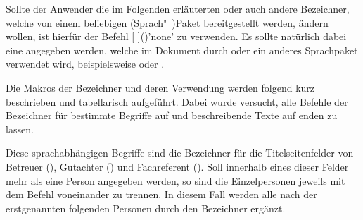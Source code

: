 \begin{Declaration*}{}
\begin{Declaration*}{}
\begin{Declaration*}{}
Sollte der Anwender die im Folgenden erläuterten oder auch andere Bezeichner, 
welche von einem beliebigen (Sprach"~)Paket bereitgestellt werden, ändern 
wollen, ist hierfür der Befehl
[%
]()'none'
zu verwenden. Es sollte natürlich dabei eine  angegeben werden, 
welche im Dokument durch  oder ein anderes Sprachpaket verwendet 
wird, beispielsweise  oder . 

Die Makros der Bezeichner und deren Verwendung werden folgend kurz beschrieben 
und tabellarisch aufgeführt. Dabei wurde versucht, alle Befehle der Bezeichner 
für bestimmte Begriffe auf  und beschreibende 
Texte auf  enden zu lassen.

\begin{Declaration}{}
\begin{Declaration}{}
\begin{Declaration}{}
\begin{Declaration}{}
\begin{Declaration}{}
\begin{Declaration}{}
\begin{Declaration}{}
\begin{Declaration}[v2.02]{}
\printdeclarationlist%
%
%
%
%
%
Diese sprachabhängigen Begriffe sind die Bezeichner für die Titelseitenfelder 
von Betreuer (), Gutachter () und Fachreferent 
(). Soll innerhalb eines dieser Felder mehr als eine Person 
angegeben werden, so sind die Einzelpersonen jeweils mit dem Befehl  
voneinander zu trennen. In diesem Fall werden alle nach der erstgenannten 
folgenden Personen durch den Bezeichner  
ergänzt.


\end{Declaration}
\end{Declaration}
\end{Declaration}
\end{Declaration}
\end{Declaration}
\end{Declaration}
\end{Declaration}
\end{Declaration}
\end{Declaration*}
\end{Declaration*}
\end{Declaration*}
